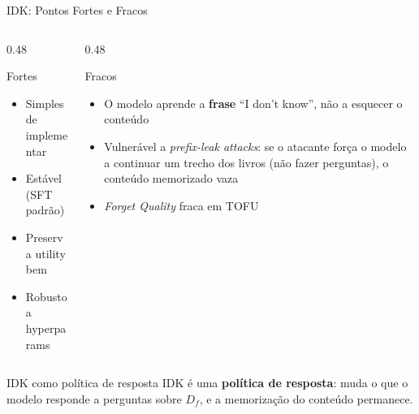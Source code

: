 \documentclass[aspectratio=169,xcolor=dvipsnames]{beamer}
\begin{document}
  \begin{frame}{IDK: Pontos Fortes e Fracos}
    \begin{columns}[T]
      \begin{column}{0.48\textwidth}
        \begin{block}{Fortes}
          \begin{itemize}\setlength{\itemsep}{0pt}
            \item Simples de implementar
            \item Estável (SFT padrão)
            \item Preserva utility bem
            \item Robusto a hyperparams
          \end{itemize}
        \end{block}
      \end{column}
      \begin{column}{0.48\textwidth}
        \begin{alertblock}{Fracos}
          \begin{itemize}\setlength{\itemsep}{0pt}
            \item O modelo aprende a \textbf{frase} ``I don't know'', não a esquecer o conteúdo
            \item Vulnerável a \textit{prefix-leak attacks}: se o atacante força o modelo a continuar um trecho dos livros (não fazer perguntas), o conteúdo memorizado vaza
            \item \textit{Forget Quality} fraca em TOFU
          \end{itemize}
        \end{alertblock}
      \end{column}
    \end{columns}

    \vspace{0.4em}
    \begin{block}{IDK como política de resposta}
      IDK é uma \textbf{política de resposta}: muda o que o modelo responde a perguntas sobre $D_f$, e a memorização do conteúdo permanece.
    \end{block}
  \end{frame}
\end{document}
